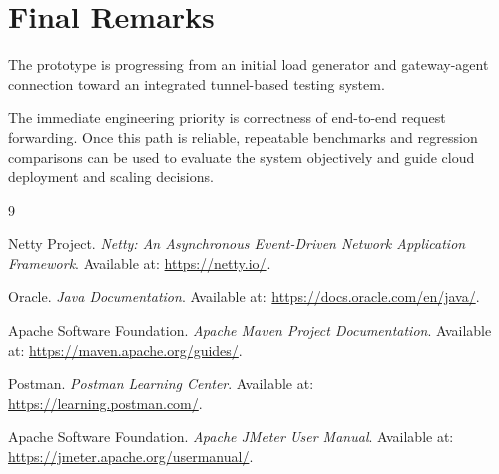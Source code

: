 \documentclass[11pt,a4paper,oneside]{report}
\begin{document}
\section{Final Remarks}

The prototype is progressing from an initial load generator
and gateway-agent connection toward an integrated tunnel-based
testing system.

The immediate engineering priority is correctness of
end-to-end request forwarding. Once this path is reliable,
repeatable benchmarks and regression comparisons can be used
to evaluate the system objectively and guide cloud deployment
and scaling decisions.


\clearpage
{}
{}

\begin{thebibliography}{9}

Netty Project.
\emph{Netty: An Asynchronous Event-Driven Network Application
Framework}.
Available at: \url{https://netty.io/}.

Oracle.
\emph{Java Documentation}.
Available at: \url{https://docs.oracle.com/en/java/}.

Apache Software Foundation.
\emph{Apache Maven Project Documentation}.
Available at: \url{https://maven.apache.org/guides/}.

Postman.
\emph{Postman Learning Center}.
Available at: \url{https://learning.postman.com/}.

Apache Software Foundation.
\emph{Apache JMeter User Manual}.
Available at: \url{https://jmeter.apache.org/usermanual/}.

\end{thebibliography}
\end{document}
